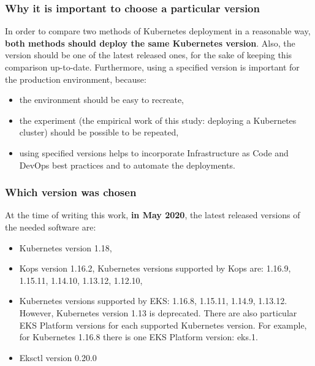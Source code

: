 \subsubsection{Why it is important to choose a particular version}
In order to compare two methods of Kubernetes deployment in a reasonable way, \textbf{both methods should deploy the same Kubernetes version}. Also, the version should be one of the latest released ones, for the sake of keeping this comparison up-to-date. Furthermore, using a specified version is important for the production environment, because:
\begin{itemize}
\item the environment should be easy to recreate,
\item the experiment (the empirical work of this study: deploying a Kubernetes cluster) should be possible to be repeated,
\item using specified versions helps to incorporate Infrastructure as Code and DevOps best practices and to automate the deployments.
\end{itemize}

\subsubsection{Which version was chosen}
At the time of writing this work, \textbf{in May 2020}, the latest released versions of the needed software are:
\begin{itemize}
\item Kubernetes version 1.18\cite{online-k8s-blog-latest},
\item Kops version 1.16.2, Kubernetes versions supported by Kops are: 1.16.9, 1.15.11, 1.14.10, 1.13.12, 1.12.10\cite{online-kops-versions}\cite{kops-releases}\cite{online-kops-versions2},
\item Kubernetes versions supported by EKS: 1.16.8, 1.15.11, 1.14.9, 1.13.12. However, Kubernetes version 1.13 is deprecated\cite{online-eks-versions}. There are also particular EKS Platform versions for each supported Kubernetes version. For example, for Kubernetes 1.16.8 there is one EKS Platform version: eks.1\cite{online-eks-platform-versions}.
\item Eksctl version 0.20.0\cite{online-eksctl-versions}
\end{itemize}

